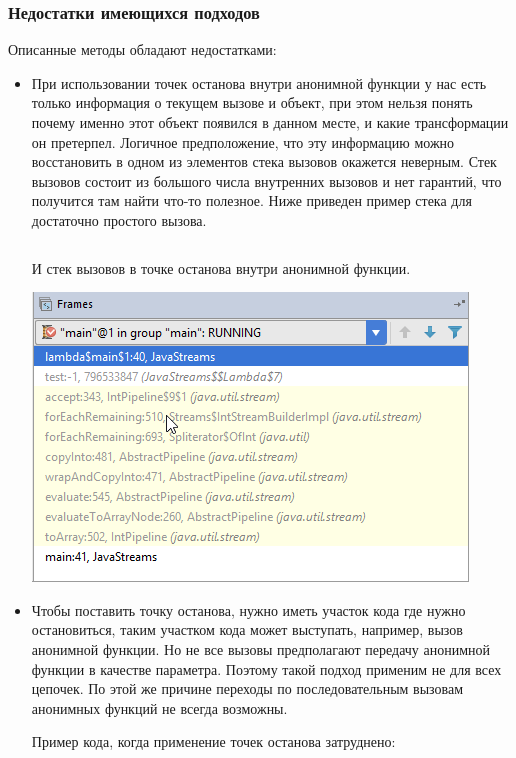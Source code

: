 \subsubsection{Недостатки имеющихся подходов}
Описанные методы обладают недостатками:
\begin{itemize}
	\item При использовании точек останова внутри анонимной функции у нас есть только информация о текущем вызове и объект, при этом нельзя понять почему именно этот объект появился в данном месте, и какие трансформации он претерпел. Логичное предположение, что эту информацию можно восстановить в одном из элементов стека вызовов окажется неверным. Стек вызовов состоит из большого числа внутренних вызовов и нет гарантий, что получится там найти что-то полезное. Ниже приведен пример стека для достаточно простого вызова.
	\inputminted{java}{chapter1/code/SimplestStreamExample.java}
	
	И стек вызовов в точке останова внутри анонимной функции.
	
	\includegraphics[scale=1.]{chapter1/img/stack.png}
	
	\item Чтобы поставить точку останова, нужно иметь участок кода где нужно остановиться, таким участком кода может выступать, например, вызов анонимной функции. Но не все вызовы предполагают передачу анонимной функции в качестве параметра. Поэтому такой подход применим не для всех цепочек. По этой же причине переходы по последовательным вызовам анонимных функций не всегда возможны.
	
	Пример кода, когда применение точек останова затруднено: \inputminted{java}{chapter1/code/HardToUseBreakpoint.java}
\end{itemize}

